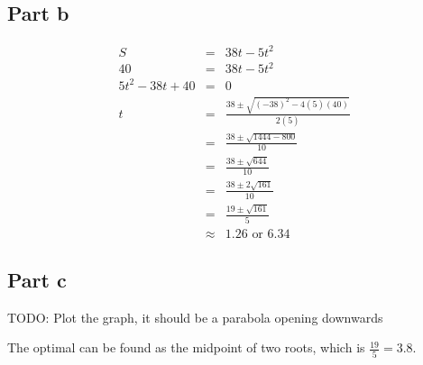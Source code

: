 \subsection*{Part b}
\begin{eqnarray*}
    S &=& 38t - 5t^2 \\
    40 &=& 38t - 5t^2 \\
    5t^2 - 38t + 40 &=& 0 \\
    t &=& \frac{38 \pm \sqrt{(-38)^2 - 4(5)(40)}}{2(5)} \\
        &=& \frac{38 \pm \sqrt{1444 - 800}}{10} \\
        &=& \frac{38 \pm \sqrt{644}}{10} \\
        &=& \frac{38 \pm 2\sqrt{161}}{10} \\
        &=& \frac{19 \pm \sqrt{161}}{5} \\
        &\approx& 1.26 \text{ or } 6.34
\end{eqnarray*}
\subsection*{Part c}
TODO: Plot the graph, it should be a parabola opening downwards

The optimal can be found as the midpoint of two roots, which is $ \frac{19}{5} = 3.8 $.

